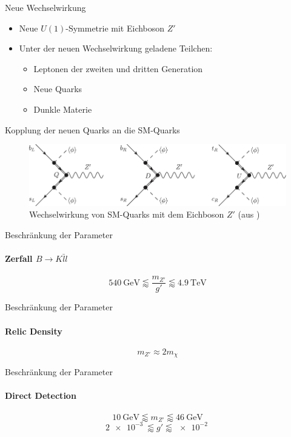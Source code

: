 \begin{frame}{Neue Wechselwirkung}
\begin{itemize}
	\setlength\itemsep{1em}
	\item Neue $U(1)$-Symmetrie mit Eichboson $Z'$ \cite{InColour}
	\item Unter der neuen Wechselwirkung geladene Teilchen:
	\begin{itemize}
		\item Leptonen der zweiten und dritten Generation
		\item Neue Quarks
		\item Dunkle Materie \cite{Z}
	\end{itemize}
\end{itemize}
\end{frame}

\begin{frame}{Kopplung der neuen Quarks an die SM-Quarks}
\begin{figure}
	\includegraphics[width=\textwidth]{Bilder/NeueQuarks.pdf}
	\caption{Wechselwirkung von SM-Quarks mit dem Eichboson $Z'$ (aus \cite{InColour})}
\end{figure}
\end{frame}

\begin{frame}{Beschränkung der Parameter}
\framesubtitle{Zerfall $B\rightarrow K\bar{l}l$}
	\[ \SI{540}{\giga\electronvolt}\lessapprox\frac{m_{Z'}}{g'}\lessapprox\SI{4.9}{\tera\electronvolt} \]
\end{frame}

\begin{frame}{Beschränkung der Parameter}
\framesubtitle{Relic Density}
	\[ m_{Z'}\approx 2m_\chi \]
\end{frame}

\begin{frame}{Beschränkung der Parameter}
\framesubtitle{Direct Detection}
	\[ \SI{10}{\giga\electronvolt}\lessapprox m_{Z'} \lessapprox\SI{46}{\giga\electronvolt} \]
	\[ \SI{2e-3}{}\lessapprox g' \lessapprox\SI{e-2}{} \]
\end{frame}